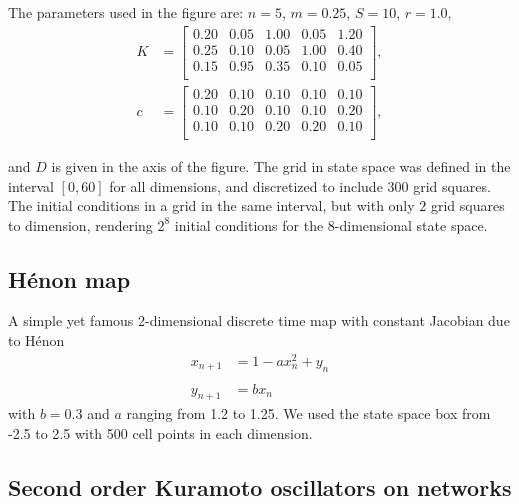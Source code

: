 \documentclass[9pt,twoside,lineno]{pnas-new}
\begin{document}
The parameters used in the figure are: $n = 5$, $m = 0.25$, $S = 10$, $r = 1.0$, 
\begin{align*}
        K &= \begin{bmatrix}
        0.20 & 0.05 & 1.00 & 0.05 & 1.20 \\
        0.25 & 0.10 & 0.05 & 1.00 & 0.40 \\ 
        0.15 & 0.95 & 0.35 & 0.10 & 0.05 \\
        \end{bmatrix}, \\
        c &= \begin{bmatrix}
        0.20 &0.10 &0.10 &0.10 &0.10\\
        0.10 &0.20 &0.10 &0.10 &0.20\\
        0.10 &0.10 &0.20 &0.20 &0.10 \\
    \end{bmatrix},
\end{align*}

and $D$ is given in the axis of the figure. The grid in state space was defined in the interval $[0, 60]$ for all dimensions, and discretized to include $300$ grid squares. The initial conditions in a grid in the same interval, but with only $2$ grid squares to dimension, rendering $2^8$ initial conditions for the $8$-dimensional state space. 


\subsection*{Hénon map}
A simple yet famous 2-dimensional discrete time map with constant Jacobian due to H\'enon
\begin{align*}
    x_{n+1} &= 1 - ax^2_n+y_n \\\\
    y_{n+1} & = bx_n
\end{align*}
with $b = 0.3$ and $a$ ranging from 1.2 to 1.25. We used the state space box from -2.5 to 2.5 with 500 cell points in each dimension.

\subsection*{Second order Kuramoto oscillators on networks}
\end{document}
